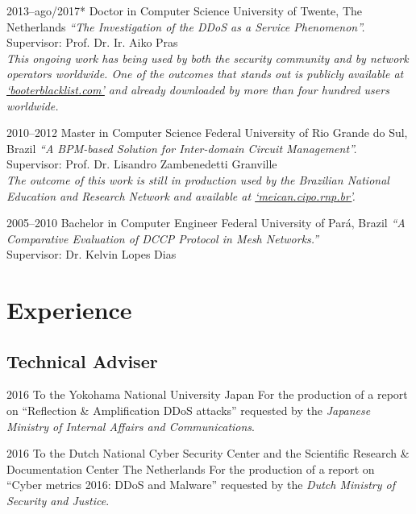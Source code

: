 \documentclass[print]{styles/friggeri-cv-mac} %
\begin{document}
\begin{entrylist}

\entry
{2013--ago/2017*}
{Doctor {\normalfont in Computer Science}}
{University of Twente, The Netherlands}
{\emph{``The Investigation of the DDoS as a Service Phenomenon''.} \\
Supervisor: Prof. Dr. Ir. Aiko Pras\\	
\textit{This ongoing work has being used by both the security community and by
network operators worldwide. One of the outcomes that stands out is publicly available at \href{http://booterblacklist.com}{`booterblacklist.com'} and  already
downloaded by more than four hundred users worldwide.}}

\entry
{2010--2012}
{Master {\normalfont in Computer Science}}
{Federal University of Rio Grande do Sul, Brazil}
{\emph{``A BPM-based Solution for Inter-domain Circuit Management''.}\\
Supervisor: Prof. Dr. Lisandro Zambenedetti Granville\\
\textit{The outcome of this work is still in production used by the Brazilian
National Education and Research Network and available at
\href{http://meican.cipo.rnp.br/}{`meican.cipo.rnp.br'}.}}

\entry
{2005--2010}
{Bachelor {\normalfont in Computer Engineer}}
{Federal University of Par\'a, Brazil}
{\emph{``A Comparative Evaluation of DCCP Protocol in Mesh Networks.''} \\ 
Supervisor: Dr. Kelvin Lopes Dias
}

\end{entrylist}

\section{Experience}\vspace{-5pt}
\subsection{Technical Adviser}\vspace{-5pt}
\begin{entrylist}
\entry
{2016}
{To the Yokohama National University}
{Japan}
{For the production of a report on ``Reflection \& Amplification DDoS attacks''
requested by the \emph{Japanese Ministry of Internal Affairs and
Communications}.}

\entry
{2016}
{To the Dutch National Cyber Security Center and the Scientific Research \& Documentation Center}
{The Netherlands}
{For the production of a report on ``Cyber metrics 2016: DDoS and Malware''
requested by the \emph{Dutch Ministry of Security and Justice}.} \end{entrylist}
\end{document}

